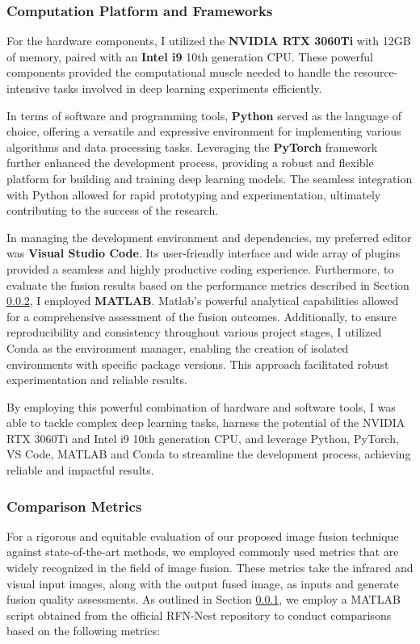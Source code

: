 \subsubsection{Computation Platform and Frameworks} \label{subsec:platform}

For the hardware components, I utilized the \textbf{NVIDIA RTX 3060Ti} with 12GB of memory, paired with an \textbf{Intel i9} 10th generation CPU. These powerful components provided the computational muscle needed to handle the resource-intensive tasks involved in deep learning experiments efficiently.

In terms of software and programming tools, \textbf{Python} served as the language of choice, offering a versatile and expressive environment for implementing various algorithms and data processing tasks. Leveraging the \textbf{PyTorch} framework further enhanced the development process, providing a robust and flexible platform for building and training deep learning models. The seamless integration with Python allowed for rapid prototyping and experimentation, ultimately contributing to the success of the research.

In managing the development environment and dependencies, my preferred editor was \textbf{Visual Studio Code}. Its user-friendly interface and wide array of plugins provided a seamless and highly productive coding experience. Furthermore, to evaluate the fusion results based on the performance metrics described in Section \ref{subsec:metrics}, I employed \textbf{MATLAB}. Matlab's powerful analytical capabilities allowed for a comprehensive assessment of the fusion outcomes. Additionally, to ensure reproducibility and consistency throughout various project stages, I utilized Conda as the environment manager, enabling the creation of isolated environments with specific package versions. This approach facilitated robust experimentation and reliable results.

By employing this powerful combination of hardware and software tools, I was able to tackle complex deep learning tasks, harness the potential of the NVIDIA RTX 3060Ti and Intel i9 10th generation CPU, and leverage Python, PyTorch, VS Code, MATLAB and Conda to streamline the development process, achieving reliable and impactful results.

\subsubsection{Comparison Metrics} \label{subsec:metrics}
For a rigorous and equitable evaluation of our proposed image fusion technique against state-of-the-art methods, we employed commonly used metrics that are widely recognized in the field of image fusion. These metrics take the infrared and visual input images, along with the output fused image, as inputs and generate fusion quality assessments. As outlined in Section \ref{subsec:platform}, we employ a MATLAB script obtained from the official RFN-Nest repository \cite{li2021rfn} to conduct comparisons based on the following metrics:

